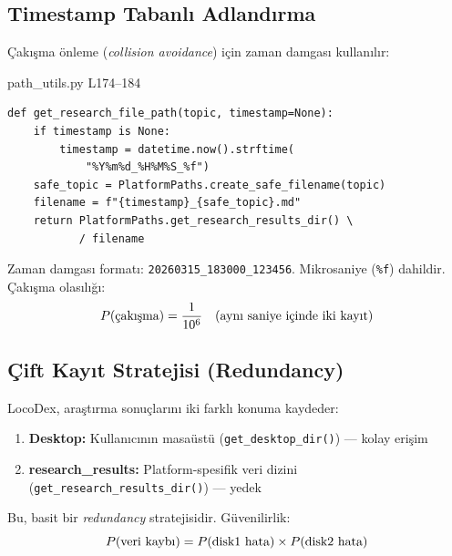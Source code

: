 \subsection{Timestamp Tabanl{\i} Adland{\i}rma}

\c{C}ak{\i}\c{s}ma \"{o}nleme (\textit{collision avoidance}) i\c{c}in zaman damgas{\i} kullan{\i}l{\i}r:

\begin{kodref}{path\_utils.py L174--184}
\begin{lstlisting}[caption={Timestamp tabanl{\i} dosya ad{\i}}]
def get_research_file_path(topic, timestamp=None):
    if timestamp is None:
        timestamp = datetime.now().strftime(
            "%Y%m%d_%H%M%S_%f")
    safe_topic = PlatformPaths.create_safe_filename(topic)
    filename = f"{timestamp}_{safe_topic}.md"
    return PlatformPaths.get_research_results_dir() \
           / filename
\end{lstlisting}
\end{kodref}

Zaman damgas{\i} format{\i}: \texttt{20260315\_183000\_123456}. Mikrosaniye (\texttt{\%f}) dahildir. \c{C}ak{\i}\c{s}ma olas{\i}l{\i}\u{g}{\i}:
\begin{equation}
\label{eq:collision_prob}
P(\text{\c{c}ak{\i}\c{s}ma}) = \frac{1}{10^6} \quad (\text{ayn{\i} saniye i\c{c}inde iki kay{\i}t})
\end{equation}

\subsection{\c{C}ift Kay{\i}t Stratejisi (Redundancy)}

LocoDex, ara\c{s}t{\i}rma sonu\c{c}lar{\i}n{\i} iki farkl{\i} konuma kaydeder:

\begin{enumerate}
  \item \textbf{Desktop:} Kullan{\i}c{\i}n{\i}n masa\"{u}st\"{u} (\texttt{get\_desktop\_dir()}) --- kolay eri\c{s}im
  \item \textbf{research\_results:} Platform-spesifik veri dizini (\texttt{get\_research\_results\_dir()}) --- yedek
\end{enumerate}

Bu, basit bir \emph{redundancy} stratejisidir. G\"{u}venilirlik:
\begin{equation}
\label{eq:redundancy}
P(\text{veri kayb{\i}}) = P(\text{disk1 hata}) \times P(\text{disk2 hata})
\end{equation}

